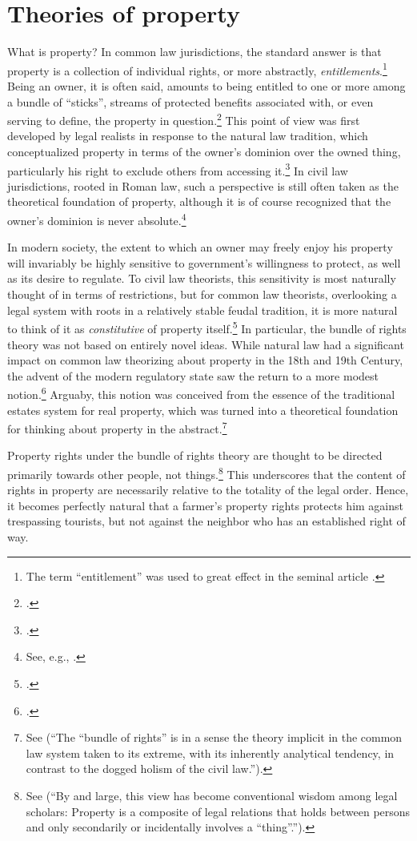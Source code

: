 \section{Theories of property}

What is property? In common law jurisdictions, the standard answer is that property is a collection of individual rights, or more abstractly, {\it entitlements}.\footnote{The term ``entitlement'' was used to great effect in the seminal article \cite{calabresi72}.} Being an owner, it is often said, amounts to being entitled to one or more among a bundle of ``sticks'', streams of protected benefits associated with, or even serving to define, the property in question.\footcite[357-358]{merrill01} This point of view was first developed by legal realists in response to the natural law tradition, which conceptualized property in terms of the owner's dominion over the owned thing, particularly his right to exclude others from accessing it.\footcite[193-195]{klein11} In civil law jurisdictions, rooted in Roman law, such a perspective is still often taken as the theoretical foundation of property, although it is of course recognized that the owner's dominion is never absolute.\footnote{See, e.g., \cite[?]{foster10}.}

In modern society, the extent to which an owner may freely enjoy his property will invariably be highly sensitive to government's willingness to protect, as well as its desire to regulate. To civil law theorists, this sensitivity is most naturally thought of in terms of restrictions, but for common law theorists, overlooking a legal system with roots in a relatively stable feudal tradition, it is more natural to think of it as {\it constitutive} of property itself.\footcite[7]{chang12} In particular, the bundle of rights theory was not based on entirely novel ideas. While natural law had a significant impact on common law theorizing about property in the 18th and 19th Century, the advent of the modern regulatory state saw the return to a more modest notion.\footcite[195]{klein11} Arguaby, this notion was conceived from the essence of the traditional estates system for real property, which was turned into a theoretical foundation for thinking about property in the abstract.\footnote{See \cite[7]{chang12}(``The ``bundle of rights'' is in a sense the theory implicit in the common law system taken to its extreme, with its inherently analytical tendency, in contrast to the dogged holism of the civil law.'').} 

Property rights under the bundle of rights theory are thought to be directed primarily towards other people, not things.\footnote{See \cite[357-358]{merrill01} (``By and large, this view has become conventional wisdom among legal scholars: Property is a composite of legal relations that holds between persons and only secondarily or incidentally involves a ``thing''.'').} This underscores that the content of rights in property are necessarily relative to the totality of the legal order. Hence, it becomes perfectly natural that a farmer's property rights protects him against trespassing tourists, but not against the neighbor who has an established right of way. 

